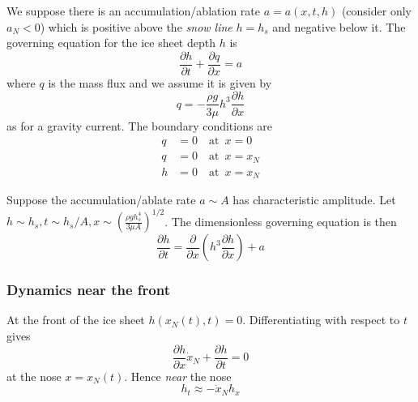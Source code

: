 \documentclass{jknotes}
\begin{document}
We suppose there is an accumulation/ablation rate $a=a(x,t,h)$ (consider only
$a_N < 0$) which is positive above the \emph{snow line} $h = h_s$ and negative
below it. The governing equation for the ice sheet depth $h$ is
\begin{equation}
	\frac{\partial h}{\partial t} + \frac{\partial q}{\partial x} = a
\end{equation}
where $q$ is the mass flux and we assume it is given by
\begin{equation}
	q = -\frac{\rho g}{3\mu} h^3 \frac{\partial h}{\partial x}
\end{equation}
as for a gravity current. The boundary conditions are
\begin{align}
	q &= 0 \hspace{1em} \text{at}\,\,\, x=0 \\
	q &= 0 \hspace{1em} \text{at}\,\,\, x=x_N \\
	h &= 0 \hspace{1em} \text{at}\,\,\, x=x_N
\end{align}

Suppose the accumulation/ablate rate $a \sim A$ has characteristic amplitude.
Let $h \sim h_s, t \sim h_s/A, x \sim \left(\frac{\rho g h_s^4}{3\mu
A}\right)^{1/2}$. The dimensionless governing equation is then
\begin{equation}
	\frac{\partial h}{\partial t} = \frac{\partial}{\partial x} \left( h^3
	\frac{\partial h}{\partial x}\right) + a\label{eq:l14:6}
\end{equation}

\subsubsection{Dynamics near the front}
At the front of the ice sheet $h(x_N(t),t)=0$. Differentiating with respect to
$t$ gives
\begin{equation}
	\frac{\partial h}{\partial x} \dot{x}_N + \frac{\partial h}{\partial t} =
	0
\end{equation}
at the nose $x=x_N(t)$. Hence \emph{near} the nose
\begin{equation}
	h_t \approx -\dot{x}_N h_x
\end{equation}
\end{document}
